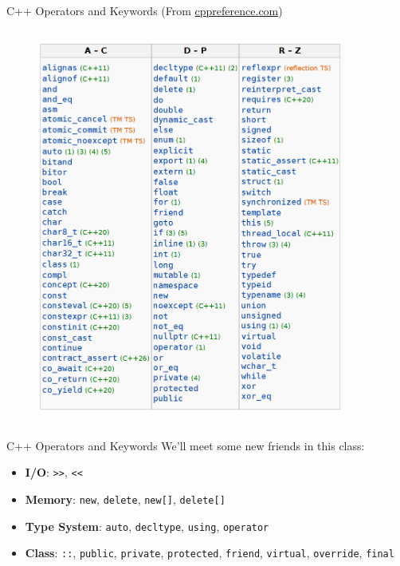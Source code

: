 \begin{frame}[fragile]{C++ Operators and Keywords (From \textcolor{blue}{\href{https://en.cppreference.com/w/cpp/language/}{cppreference.com}})}
\begin{columns}
\begin{column}{0.4\textwidth}
\begin{figure}
                \includegraphics[width=0.9\textwidth]{day8_pm/img/1-keywords}
            \end{figure}
        \end{column}
    \end{columns}
\end{frame}

\begin{frame}[fragile]{ C++ Operators and Keywords}
    We'll meet some new friends in this class:
    \begin{itemize}
        \item \textbf{I/O}:  \texttt{>>}, \texttt{<<}
        \item \textbf{Memory}: \texttt{new}, \texttt{delete}, \texttt{new[]}, \texttt{delete[]}
        \item \textbf{Type System}: \texttt{auto}, \texttt{decltype}, \texttt{using}, \texttt{operator}
        \item \textbf{Class}: \texttt{::}, \texttt{public}, \texttt{private}, \texttt{protected}, \texttt{friend}, \texttt{virtual}, \texttt{override}, \texttt{final}
    \end{itemize}
\end{frame}

